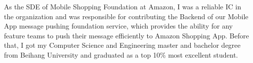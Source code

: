 


As the SDE of Mobile Shopping Foundation at Amazon, I was a reliable IC in the organization and was responsible for contributing the Backend of our Mobile App message pushing foundation service, which provides the ability for any feature teams to push their message efficiently to Amazon Shopping App. Before that, I got my Computer Science and Engineering master and bachelor degree from Beihang University and graduated as a top 10\% most excellent student.
